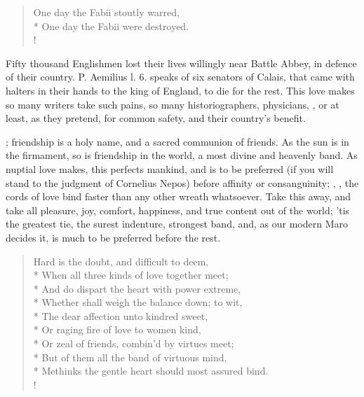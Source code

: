 {\begin{latin}
\begin{verse}
\end{verse}
\end{latin}
\translationrule
\begin{verse}
One day the Fabii stoutly warred,\\*
One day the Fabii were destroyed.\\!
\end{verse}
%
Fifty thousand Englishmen lost their lives willingly near Battle Abbey,
in defence of their country. P. Aemilius l. 6. speaks of six
senators of Calais, that came with halters in their hands to the king
of England, to die for the rest. This love makes so many writers take
such pains, so many historiographers, physicians, \etc{}, or at least, as
they pretend, for common safety, and their country's benefit.

; friendship is
a holy name, and a sacred communion of friends. As the sun is in
the firmament, so is friendship in the world, a most divine and
heavenly band. As nuptial love makes, this perfects mankind, and is to
be preferred (if you will stand to the judgment of Cornelius
Nepos) before affinity or consanguinity; , \etc{}, the cords of love bind faster
than any other wreath whatsoever. Take this away, and take all
pleasure, joy, comfort, happiness, and true content out of the world;
'tis the greatest tie, the surest indenture, strongest band, and, as
our modern Maro decides it, is much to be preferred before the rest.

\begin{verse}
Hard is the doubt, and difficult to deem,\\*
When all three kinds of love together meet;\\*
And do dispart the heart with power extreme,\\*
Whether shall weigh the balance down; to wit,\\*
The dear affection unto kindred sweet,\\*
Or raging fire of love to women kind,\\*
Or zeal of friends, combin'd by virtues meet;\\*
But of them all the band of virtuous mind,\\*
Methinks the gentle heart should most assured bind.\\!


\end{verse}}
